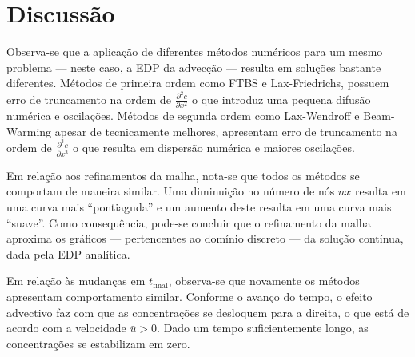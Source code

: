 \chapter{Discussão}

Observa-se que a aplicação de diferentes métodos numéricos para um mesmo
problema --- neste caso, a EDP da advecção --- resulta em soluções bastante
diferentes. Métodos de primeira ordem como FTBS e Lax-Friedrichs, possuem erro
de truncamento na ordem de $\frac{\partial^2 c}{\partial x^2}$ o que introduz
uma pequena difusão numérica e oscilações. Métodos de segunda ordem como
Lax-Wendroff e Beam-Warming apesar de tecnicamente melhores, apresentam erro de
truncamento na ordem de $\frac{\partial^3 c}{\partial x^3}$ o que resulta em
dispersão numérica e maiores oscilações.

Em relação aos refinamentos da malha, nota-se que todos os métodos se comportam
de maneira similar. Uma diminuição no número de nós $nx$ resulta em uma curva
mais ``pontiaguda'' e um aumento deste resulta em uma curva mais ``suave''.
Como consequência, pode-se concluir que o refinamento da malha aproxima os
gráficos --- pertencentes ao domínio discreto --- da solução contínua, dada
pela EDP analítica.

Em relação às mudanças em $t_{\text{final}}$, observa-se que novamente os
métodos apresentam comportamento similar. Conforme o avanço do tempo, o efeito
advectivo faz com que as concentrações se desloquem para a direita, o que está
de acordo com a velocidade $\bar{u} > 0$. Dado um tempo suficientemente longo,
as concentrações se estabilizam em zero.
